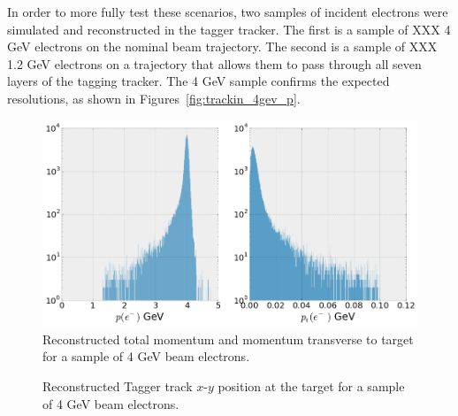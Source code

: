 In order to more fully test these scenarios, two samples of incident electrons were simulated and reconstructed in the tagger tracker.  The first is a sample of XXX 4 GeV electrons on the nominal beam trajectory.  The second is a sample of XXX 1.2 GeV electrons on a trajectory that allows them to pass through all seven layers of the tagging tracker.  The 4 GeV sample confirms the expected resolutions, as shown in
Figures~\ref{fig:trackin_4gev_p}.  
\begin{figure}[htp]
    \centering
    \includegraphics[width=\textwidth]{images/tagger_tracker_p_pt_4pt0_gev.png}
    \caption{\small{Reconstructed total momentum and momentum transverse to 
                    target for a sample of 4 GeV beam electrons.}}
    \label{fig:tracking_4gev_p}
\end{figure}
\begin{figure}[htp]
    \centering
    \caption{\small{Reconstructed Tagger track $x$-$y$ position at the target for a
    sample of 4 GeV beam electrons.}}
    \label{fig:tracking_4gev_pos}
\end{figure}

